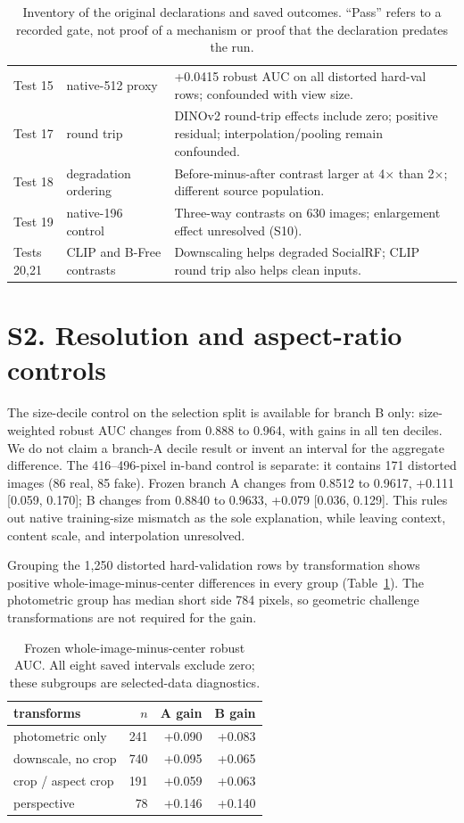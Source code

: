 \documentclass[letterpaper]{article}
\begin{document}
\begin{table}[t]
\begin{tabular}{p{}p{}p{}}
Test 15 & native-512 proxy & +0.0415 robust AUC on all distorted hard-val rows; confounded with view size. \\
Test 17 & round trip & DINOv2 round-trip effects include zero; positive residual; interpolation/pooling remain confounded. \\
Test 18 & degradation ordering & Before-minus-after contrast larger at 4$\times$ than 2$\times$; different source population. \\
Test 19 & native-196 control & Three-way contrasts on 630 images; enlargement effect unresolved (S10). \\
Tests 20,21 & CLIP and B-Free contrasts & Downscaling helps degraded SocialRF; CLIP round trip also helps clean inputs. \\
\bottomrule
\end{tabular}
\caption{Inventory of the original declarations and saved outcomes. ``Pass'' refers to a recorded gate, not proof of a mechanism or proof that the declaration predates the run.}
\end{table}

\section{S2. Resolution and aspect-ratio controls}

The size-decile control on the selection split is available for branch B only: size-weighted robust AUC changes from 0.888 to 0.964, with gains in all ten deciles. We do not claim a branch-A decile result or invent an interval for the aggregate difference. The 416--496-pixel in-band control is separate: it contains 171 distorted images (86 real, 85 fake). Frozen branch A changes from 0.8512 to 0.9617, +0.111 [0.059, 0.170]; B changes from 0.8840 to 0.9633, +0.079 [0.036, 0.129]. This rules out native training-size mismatch as the sole explanation, while leaving context, content scale, and interpolation unresolved.

Grouping the 1,250 distorted hard-validation rows by transformation shows positive whole-image-minus-center differences in every group (Table~\ref{tab:groups}). The photometric group has median short side 784 pixels, so geometric challenge transformations are not required for the gain.

\begin{table}[t]
\centering\small
\begin{tabular}{lrrr}
\toprule
transforms & $n$ & A gain & B gain \\
\midrule
photometric only & 241 & +0.090 & +0.083 \\
downscale, no crop & 740 & +0.095 & +0.065 \\
crop / aspect crop & 191 & +0.059 & +0.063 \\
perspective & 78 & +0.146 & +0.140 \\
\bottomrule
\end{tabular}
\caption{Frozen whole-image-minus-center robust AUC. All eight saved intervals exclude zero; these subgroups are selected-data diagnostics.}
\label{tab:groups}
\end{table}
\end{document}
